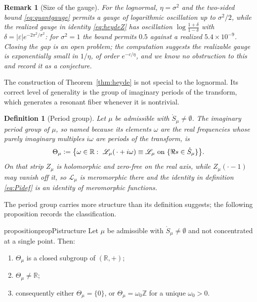 \documentclass[sn-mathphys-num]{sn-jnl}
\theoremstyle{thmstyleone}%
\theoremstyle{thmstyletwo}%
\newtheorem{remark}{Remark}%
\theoremstyle{thmstylethree}%
\newtheorem{definition}{Definition}%
\theoremstyle{thmstyleone}%
\providecommand{\R}{\mathbb{R}}
\providecommand{\Z}{\mathbb{Z}}
\providecommand{\Leh}{\mathscr{L}}
\providecommand{\eqdef}{\mathrel{\vcentcolon=}}
\begin{document}
	\begin{remark}[Size of the gauge]\label{rem:heydequant}
		For the lognormal, $\eta=\sigma^2$ and the two-sided bound
		\eqref{eq:quantgauge} permits a gauge of logarithmic oscillation
		up to $\sigma^2/2$, while the realized gauge in identity
		\eqref{eq:heydeZ} has oscillation
		$\log\frac{1+\delta}{1-\delta}$ with
		$\delta=|\varepsilon|e^{-2\pi^2/\sigma^2}$: for $\sigma^2=1$
		the bound permits $0.5$ against a realized $5.4\times10^{-9}$.
		Closing the gap is an open problem; the computation suggests the
		realizable gauge is exponentially small in $1/\eta$, of order
		$e^{-c/\eta}$, and we know no obstruction to this and record it
		as a conjecture.
	\end{remark}
	
	The construction of Theorem~\ref{thm:heyde} is not special to the
	lognormal. Its correct level of generality is the group of imaginary
	periods of the transform, which generates a resonant fiber whenever
	it is nontrivial.
	
	\begin{definition}[Period group]\label{def:periodgroup}
		Let $\mu$ be admissible with $\mathring S_\mu\neq\emptyset$. The
		\emph{imaginary period group} of $\mu$, so named because its
		elements $\omega$ are the real frequencies whose purely imaginary
		multiples $i\omega$ are periods of the transform, is
		\begin{equation}\label{eq:Pidef}
			\Theta_\mu\eqdef\bigl\{\omega\in\R:\
			\Leh_\mu(\,\cdot+i\omega)\equiv\Leh_\mu\ \text{on }
			\{\Re s\in\mathring S_\mu\}
			\bigr\} .
		\end{equation}
		On that strip $Z_\mu$ is holomorphic and zero-free on the real
		axis, while $Z_\mu(\cdot-1)$ may vanish off it, so
		$\Leh_\mu$ is meromorphic there and the identity in
		definition \eqref{eq:Pidef} is an identity of meromorphic
		functions.
	\end{definition}
	
	The period group carries more structure than its definition
	suggests; the following proposition records the classification.
	
	\begin{restatable}[Period group structure]{proposition}{propPistructure}\label{prop:Pistructure}
		Let $\mu$ be admissible with $\mathring S_\mu\neq\emptyset$ and
		not concentrated at a single point. Then:
		\begin{enumerate}[label=\textup{(\roman*)},leftmargin=2.2em]
			\item $\Theta_\mu$ is a closed subgroup of $(\R,+)$;
			\item $\Theta_\mu\neq\R$;
			\item consequently either $\Theta_\mu=\{0\}$, or
			$\Theta_\mu=\omega_0\Z$ for a unique $\omega_0>0$.
		\end{enumerate}
	\end{restatable}
	
\end{document}
